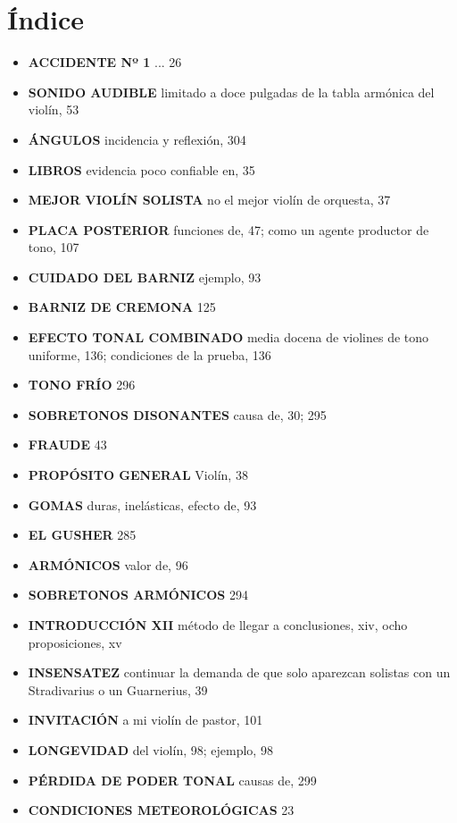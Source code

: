 \documentclass[12pt]{book}
\begin{document}
\chapter*{Índice}

\begin{itemize}
    \item \textbf{ACCIDENTE Nº 1} ... 26
    \item \textbf{SONIDO AUDIBLE} limitado a doce pulgadas de la tabla armónica del violín, 53
    \item \textbf{ÁNGULOS} incidencia y reflexión, 304
    \item \textbf{LIBROS} evidencia poco confiable en, 35
    \item \textbf{MEJOR VIOLÍN SOLISTA} no el mejor violín de orquesta, 37
    \item \textbf{PLACA POSTERIOR} funciones de, 47; como un agente productor de tono, 107
    \item \textbf{CUIDADO DEL BARNIZ} ejemplo, 93
    \item \textbf{BARNIZ DE CREMONA} 125
    \item \textbf{EFECTO TONAL COMBINADO} media docena de violines de tono uniforme, 136; condiciones de la prueba, 136
    \item \textbf{TONO FRÍO} 296
    \item \textbf{SOBRETONOS DISONANTES} causa de, 30; 295
    \item \textbf{FRAUDE} 43
    \item \textbf{PROPÓSITO GENERAL} Violín, 38
    \item \textbf{GOMAS} duras, inelásticas, efecto de, 93
    \item \textbf{EL GUSHER} 285
    \item \textbf{ARMÓNICOS} valor de, 96
    \item \textbf{SOBRETONOS ARMÓNICOS} 294
    \item \textbf{INTRODUCCIÓN XII} método de llegar a conclusiones, xiv, ocho proposiciones, xv
    \item \textbf{INSENSATEZ} continuar la demanda de que solo aparezcan solistas con un Stradivarius o un Guarnerius, 39
    \item \textbf{INVITACIÓN} a mi violín de pastor, 101
    \item \textbf{LONGEVIDAD} del violín, 98; ejemplo, 98
    \item \textbf{PÉRDIDA DE PODER TONAL} causas de, 299
    \item \textbf{CONDICIONES METEOROLÓGICAS} 23

\end{itemize}
\end{document}
